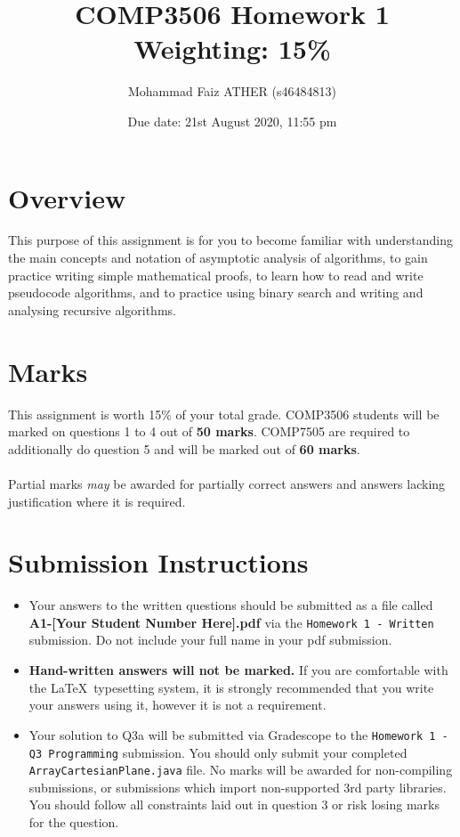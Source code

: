 \documentclass[a4,13pt]{extarticle}
\title{COMP3506 Homework 1 Weighting: 15\%}
\author{Mohammad Faiz ATHER (s46484813) }
\date{Due date: 21st August 2020, 11:55 pm}
\begin{document}
\maketitle
{}
\section*{Overview}
This purpose of this assignment is for you to become familiar with understanding the main concepts and notation of asymptotic analysis of algorithms, to gain practice writing simple mathematical proofs, to learn how to read and write pseudocode algorithms, and to practice using binary search and writing and analysing recursive algorithms.

\section*{Marks}
This assignment is worth 15\% of your total grade. COMP3506 students will be marked on questions 1 to 4 out of \textbf{50 marks}. COMP7505 are required to additionally do question 5 and will be marked out of \textbf{60 marks}.\\\\
Partial marks \textit{may} be awarded for partially correct answers and answers lacking justification where it is required.

\section*{Submission Instructions}
\begin{itemize}
	\item Your answers to the written questions should be submitted as a file called \textbf{A1-[Your Student Number Here].pdf} via the \texttt{Homework 1 - Written} submission. Do not include your full name in your pdf submission.
	\item \textbf{Hand-written answers will not be marked.} If you are comfortable with the \LaTeX\  typesetting
	      system, it is strongly recommended that you write your answers using it, however it is not a requirement.
	\item Your solution to Q3a will be submitted via Gradescope to the \texttt{Homework 1 - Q3 Programming} submission. You should only submit your completed \texttt{ArrayCartesianPlane.java} file. No marks will be awarded for non-compiling submissions, or submissions which import non-supported 3rd party libraries. You should follow all constraints laid out in question 3 or risk losing marks for the question.
\end{itemize}
\end{document}
